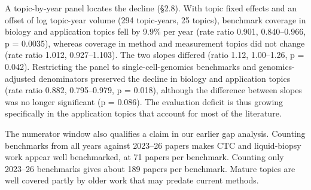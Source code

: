 \documentclass[11pt]{article}
\begin{document}
A topic-by-year panel locates the decline (§2.8). With topic fixed
effects and an offset of log topic-year volume (294 topic-years, 25
topics), benchmark coverage in biology and application topics fell by
9.9\% per year (rate ratio 0.901, 0.840--0.966, p = 0.0035), whereas
coverage in method and measurement topics did not change (rate ratio
1.012, 0.927--1.103). The two slopes differed (ratio 1.12, 1.00--1.26, p
= 0.042). Restricting the panel to single-cell-genomics benchmarks and
genomics-adjusted denominators preserved the decline in biology and
application topics (rate ratio 0.882, 0.795--0.979, p = 0.018), although
the difference between slopes was no longer significant (p = 0.086). The
evaluation deficit is thus growing specifically in the application
topics that account for most of the literature.

The numerator window also qualifies a claim in our earlier gap analysis.
Counting benchmarks from all years against 2023--26 papers makes CTC and
liquid-biopsy work appear well benchmarked, at 71 papers per benchmark.
Counting only 2023--26 benchmarks gives about 189 papers per benchmark.
Mature topics are well covered partly by older work that may predate
current methods.
\end{document}
